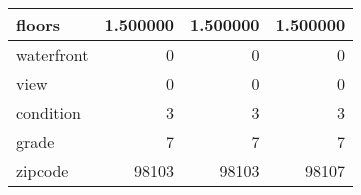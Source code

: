 \begin{table}[H]
\begin{tabular}{|l|r|r|r|}
\hline floors & \cellcolor[rgb]{0.9, 0.54, 0.52} 1.500000 & \cellcolor[rgb]{0.9, 0.54, 0.52} 1.500000 & \cellcolor[rgb]{0.9, 0.54, 0.52} 1.500000 \\
\hline waterfront & \cellcolor[rgb]{0.9, 0.54, 0.52} 0 & \cellcolor[rgb]{0.9, 0.54, 0.52} 0 & \cellcolor[rgb]{0.9, 0.54, 0.52} 0 \\
\hline view & \cellcolor[rgb]{0.9, 0.54, 0.52} 0 & \cellcolor[rgb]{0.9, 0.54, 0.52} 0 & \cellcolor[rgb]{0.9, 0.54, 0.52} 0 \\
\hline condition & \cellcolor[rgb]{0.9, 0.54, 0.52} 3 & \cellcolor[rgb]{0.9, 0.54, 0.52} 3 & \cellcolor[rgb]{0.9, 0.54, 0.52} 3 \\
\hline grade & \cellcolor[rgb]{0.9, 0.54, 0.52} 7 & \cellcolor[rgb]{0.9, 0.54, 0.52} 7 & \cellcolor[rgb]{0.9, 0.54, 0.52} 7 \\
\hline zipcode & \cellcolor[rgb]{0.9, 0.54, 0.52} 98103 & \cellcolor[rgb]{0.9, 0.54, 0.52} 98103 & 98107 \\
\hline
\end{tabular}
\end{table}

